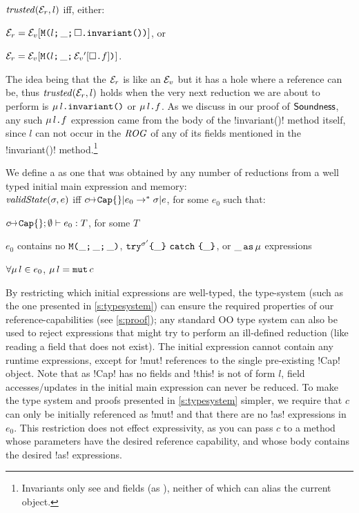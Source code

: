\indent $\mathit{trusted}(\mathcal{E}_r{}, l)$ iff, either:
\begin{iitemize}
\item $\mathcal{E}_r{}=\mathcal{E}_v{}[\texttt{M}\texttt{(}{}l\texttt{;}\,\_\texttt{;}\,\square\texttt{.} \texttt{invariant}\texttt{(}\texttt{)}\texttt{)}]$, or\SS
\item $\mathcal{E}_r{}=\mathcal{E}_v{}[\texttt{M}\texttt{(}{}l\texttt{;}\,\_\texttt{;}\,\mathcal{E}_v{}'[\square\texttt{.} f]\texttt{)}]$.
\end{iitemize}

The idea being that the $\mathcal{E}_r{}$ is like an $\mathcal{E}_v{}$ but it has a hole where a reference can be, thus $\mathit{trusted}(\mathcal{E}_r{}, l)$ holds when the very next reduction we are about to perform is $\mu\,l\texttt{.} \texttt{invariant}\texttt{(}\texttt{)}$ or $\mu\,l\texttt{.} f$.
As we discuss in our proof of $\textsf{Soundness}$, any such $\mu\,l\texttt{.} f$ expression came from the body of the \Q!invariant()! method itself, since $l$ can not occur in the $\mathit{ROG}$ of any of its fields mentioned in the \Q!invariant()! method.\footnote{Invariants only see \Q@imm@ and \Q@rep@ fields (as \Q@read@), neither of which can alias the current object.}

We define a \VS as one that was obtained by any number of reductions from a well typed initial main expression and memory:\\
\indent $\mathit{validState}(\sigma, e)$ iff $c\mapsto\Kw{Cap}\{\}|e_0\rightarrow^* \s|e$, for some $e_0$ such that:
\begin{iitemize}
\item $\tyr[c\mapsto\Kw{Cap}\{\}]{e_0}{T}$, for some $T$\SS
\item $e_0$ contains no $\texttt{M}\texttt{(}{}\_\texttt{;}\,\_\texttt{;}\,\_\texttt{)}$, $\texttt{try}^{\sigma'}\texttt{\{}\_\texttt{\}}\ \texttt{catch}\ \texttt{\{}\_\texttt{\}}$, or $\_\,\texttt{as}\,\mu$ expressions\SS
\item $\forall\mu\,l \in e_0$, $\mu\,l = \texttt{mut}\,c$
\end{iitemize}
By restricting which initial expressions are well-typed, the type-system (such as the one presented in \ref{s:typesystem}) can ensure the required properties of our reference-capabilities (see \ref{s:proof}); any standard OO type system can also be used to reject expressions that might try to perform an ill-defined reduction (like reading a field that does not exist).
The initial expression cannot contain any runtime expressions, except for \Q!mut! references to the single pre-existing \Q!Cap! object.
Note that as \Q!Cap! has no fields and \Q!this! is not of form $l$, field accesses/updates in the initial main expression can never be reduced.
To make the type system and proofs presented in \ref{s:typesystem} simpler, we require that $c$ can only be initially referenced as \Q!mut! and that there are no \Q!as! expressions in $e_0$. This restriction does not effect expressivity, as you can pass $c$ to a method whose parameters have the desired reference capability, and whose body contains the desired \Q!as! expressions.

